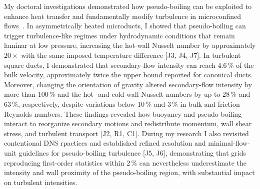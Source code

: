 \documentclass[11pt]{article}
\begin{document}
My doctoral investigations demonstrated how pseudo-boiling can be exploited to enhance heat transfer and fundamentally modify turbulence in microconfined flows~\cite{Hurtan2025,Bernades2023,Bernades2025}.
In asymmetrically heated microducts, I showed that pseudo-boiling can trigger turbulence-like regimes under hydrodynamic conditions that remain laminar at low pressure, increasing the hot-wall Nusselt number by approximately $20\times$ with the same imposed temperature difference [J3, J4, J7].
In turbulent square ducts, I demonstrated that secondary-flow intensity can reach 4.6\,\% of the bulk velocity, approximately twice the upper bound reported for canonical ducts.
Moreover, changing the orientation of gravity altered secondary-flow intensity by more than 100\,\% and the hot- and cold-wall Nusselt numbers by up to 28\,\% and 63\,\%, respectively, despite variations below 10\,\% and 3\,\% in bulk and friction Reynolds numbers.
These findings revealed how buoyancy and pseudo-boiling interact to reorganize secondary motions and redistribute momentum, wall shear stress, and turbulent transport [J2, R1, C1].
During my research I also revisited contentional DNS rpactices and established refined resolution and minimal-flow-unit guidelines for pseudo-boiling turbulence [J5, J6], demonstrating that grids reproducing first-order statistics within 2\,\% can nevertheless underestimate the intensity and wall proximity of the pseudo-boiling region, with substantial impact on turbulent intensities.
\end{document}
